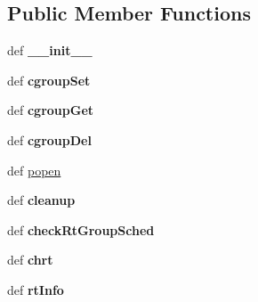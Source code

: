 \subsection*{Public Member Functions}
\begin{DoxyCompactItemize}
\item 
\hypertarget{classmininet_1_1node_1_1CPULimitedHost_ab553e99e9e6da980ae1db824bd47179a}{def {\bfseries \-\_\-\-\_\-init\-\_\-\-\_\-}}\label{classmininet_1_1node_1_1CPULimitedHost_ab553e99e9e6da980ae1db824bd47179a}

\item 
\hypertarget{classmininet_1_1node_1_1CPULimitedHost_a1b0abcf1dcf7ca1f6da3bfe0dbb483c7}{def {\bfseries cgroup\-Set}}\label{classmininet_1_1node_1_1CPULimitedHost_a1b0abcf1dcf7ca1f6da3bfe0dbb483c7}

\item 
\hypertarget{classmininet_1_1node_1_1CPULimitedHost_a3e88b301839d4c5e0c806e90d1994f24}{def {\bfseries cgroup\-Get}}\label{classmininet_1_1node_1_1CPULimitedHost_a3e88b301839d4c5e0c806e90d1994f24}

\item 
\hypertarget{classmininet_1_1node_1_1CPULimitedHost_ab53c71fa355049c37610e2bdfb3e3388}{def {\bfseries cgroup\-Del}}\label{classmininet_1_1node_1_1CPULimitedHost_ab53c71fa355049c37610e2bdfb3e3388}

\item 
def \hyperlink{classmininet_1_1node_1_1CPULimitedHost_af08d9d9f59e6c1200415ad59f502b170}{popen}
\item 
\hypertarget{classmininet_1_1node_1_1CPULimitedHost_a29fa8f056991ad3f6dff550b2950c3eb}{def {\bfseries cleanup}}\label{classmininet_1_1node_1_1CPULimitedHost_a29fa8f056991ad3f6dff550b2950c3eb}

\item 
\hypertarget{classmininet_1_1node_1_1CPULimitedHost_ac712eaf0a7c30885b1cae4f6b4e26dcc}{def {\bfseries check\-Rt\-Group\-Sched}}\label{classmininet_1_1node_1_1CPULimitedHost_ac712eaf0a7c30885b1cae4f6b4e26dcc}

\item 
\hypertarget{classmininet_1_1node_1_1CPULimitedHost_a84d29a15de4a29ef0a1476d063b0922e}{def {\bfseries chrt}}\label{classmininet_1_1node_1_1CPULimitedHost_a84d29a15de4a29ef0a1476d063b0922e}

\item 
\hypertarget{classmininet_1_1node_1_1CPULimitedHost_aa2c2d839296d4263d43cdef01a65e824}{def {\bfseries rt\-Info}}\label{classmininet_1_1node_1_1CPULimitedHost_aa2c2d839296d4263d43cdef01a65e824}


\end{DoxyCompactItemize}
